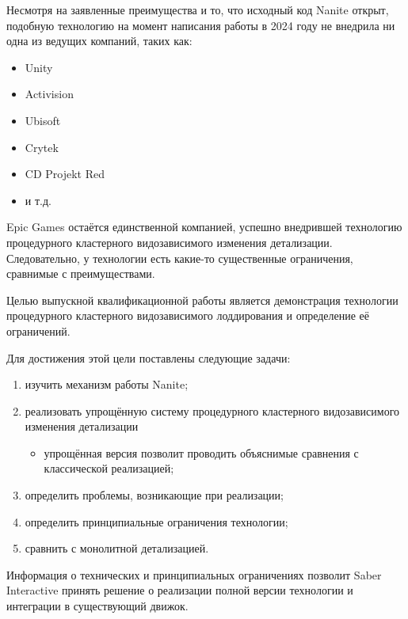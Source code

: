 Несмотря на заявленные преимущества и то, что исходный код Nanite открыт, подобную технологию на момент написания работы в 2024 году не внедрила ни одна из ведущих компаний, таких как:
\begin{itemize}
    \item Unity
    \item Activision
    \item Ubisoft
    \item Crytek
    \item CD Projekt Red
    \item и т.д.
\end{itemize}
Epic Games остаётся единственной компанией, успешно внедрившей технологию процедурного кластерного видозависимого изменения детализации.
Следовательно, у технологии есть какие-то существенные ограничения, сравнимые с преимуществами.

Целью выпускной квалификационной работы является демонстрация технологии процедурного кластерного видозависимого лоддирования и определение её ограничений.

Для достижения этой цели поставлены следующие задачи:
\begin{enumerate}
    \item изучить механизм работы Nanite;
    \item реализовать упрощённую систему процедурного кластерного видозависимого изменения детализации
    \begin{itemize}
        \item упрощённая версия позволит проводить объяснимые сравнения с классической реализацией;
    \end{itemize}
    \item определить проблемы, возникающие при реализации;
    \item определить принципиальные ограничения технологии;
    \item сравнить с монолитной детализацией.
\end{enumerate}

Информация о технических и принципиальных ограничениях позволит Saber Interactive принять решение о реализации полной версии технологии и интеграции в существующий движок.
